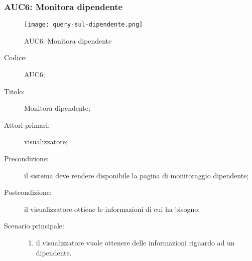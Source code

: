 \documentclass[../../../analisi-dei-requisiti.tex]{subfiles}
\begin{document}
\subsubsection{AUC6: Monitora dipendente}%
\label{subs:AUC6}

\begin{figure}[H]
  \centering
  \texttt{[image: query-sul-dipendente.png]}
  \caption{AUC6: Monitora dipendente}%
  \label{fig:AUC6}
\end{figure}

\begin{description}
  \item[Codice:] AUC6;
  \item[Titolo:] Monitora dipendente;
  \item[Attori primari:] visualizzatore;
  \item[Precondizione:]  il sistema deve rendere disponibile la pagina di monitoraggio dipendente;
  \item[Postcondizione:] il visualizzatore ottiene le informazioni di cui ha bisogno;
  \item[Scenario principale:]
  \begin{enumerate}
    \item il visualizzatore vuole ottenere delle informazioni riguardo ad un dipendente.
  \end{enumerate}
\end{description}
\end{document}
